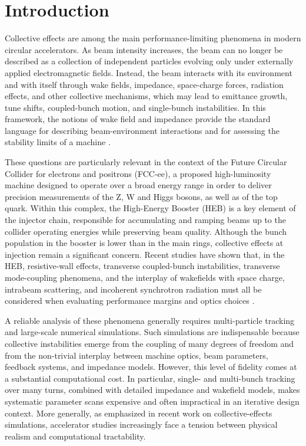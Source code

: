 \documentclass[11pt,a4paper]{article}
\begin{document}
\begin{sloppypar}
\section{Introduction}

Collective effects are among the main performance-limiting phenomena in modern circular accelerators. As beam intensity increases, the beam can no longer be described as a collection of independent particles evolving only under externally applied electromagnetic fields. Instead, the beam interacts with its environment and with itself through wake fields, impedance, space-charge forces, radiation effects, and other collective mechanisms, which may lead to emittance growth, tune shifts, coupled-bunch motion, and single-bunch instabilities. In this framework, the notions of wake field and impedance provide the standard language for describing beam-environment interactions and for assessing the stability limits of a machine \cite{metral_wake_2021-1}.

These questions are particularly relevant in the context of the Future Circular Collider for electrons and positrons (FCC-ee), a proposed high-luminosity machine designed to operate over a broad energy range in order to deliver precision measurements of the Z, W and Higgs bosons, as well as of the top quark. Within this complex, the High-Energy Booster (HEB) is a key element of the injector chain, responsible for accumulating and ramping beams up to the collider operating energies while preserving beam quality. Although the bunch population in the booster is lower than in the main rings, collective effects at injection remain a significant concern. Recent studies have shown that, in the HEB, resistive-wall effects, transverse coupled-bunch instabilities, transverse mode-coupling phenomena, and the interplay of wakefields with space charge, intrabeam scattering, and incoherent synchrotron radiation must all be considered when evaluating performance margins and optics choices \cite{gibellieri_impact_nodate}.

A reliable analysis of these phenomena generally requires multi-particle tracking and large-scale numerical simulations. Such simulations are indispensable because collective instabilities emerge from the coupling of many degrees of freedom and from the non-trivial interplay between machine optics, beam parameters, feedback systems, and impedance models. However, this level of fidelity comes at a substantial computational cost. In particular, single- and multi-bunch tracking over many turns, combined with detailed impedance and wakefield models, makes systematic parameter scans expensive and often impractical in an iterative design context. More generally, as emphasized in recent work on collective-effects simulations, accelerator studies increasingly face a tension between physical realism and computational tractability.


\end{sloppypar}
\end{document}
